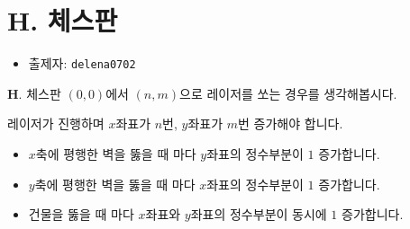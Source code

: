 \section{H. 체스판}

\begin{frame} %
    \begin{itemize}
        \item 출제자: \texttt{delena0702}
    \end{itemize}
\end{frame}

\begin{frame}{\textbf{H}. 체스판}
    $(0, 0)$에서 $(n, m)$으로 레이저를 쏘는 경우를 생각해봅시다.

    \vspace{18pt}
    
    레이저가 진행하며 $x$좌표가 $n$번, $y$좌표가 $m$번 증가해야 합니다. 
    
    \vspace{18pt}
    \begin{itemize}
        \item $x$축에 평행한 벽을 뚫을 때 마다 $y$좌표의 정수부분이 $1$ 증가합니다.
        \item $y$축에 평행한 벽을 뚫을 때 마다 $x$좌표의 정수부분이 $1$ 증가합니다.
        \item 건물을 뚫을 때 마다 $x$좌표와 $y$좌표의 정수부분이 동시에 $1$ 증가합니다.
    \end{itemize}

\end{frame}